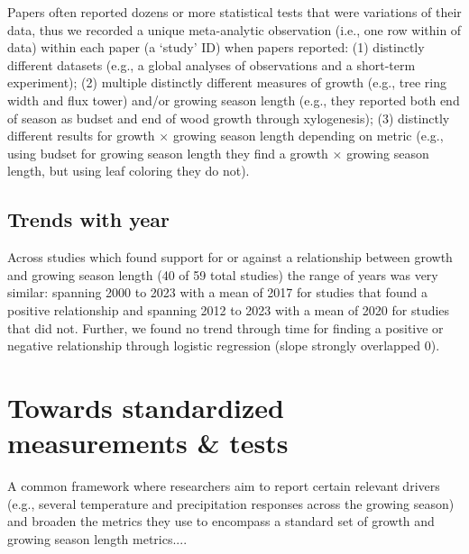 \documentclass[11pt]{article}
\begin{document}
Papers often reported dozens or more statistical tests that were variations of their data, thus we recorded a unique meta-analytic observation (i.e., one row within of data) within each paper (a `study' ID) when papers reported: (1) distinctly different datasets (e.g., a global analyses of observations and a short-term experiment); (2) multiple distinctly different measures of growth (e.g., tree ring width and flux tower) and/or growing season length (e.g., they reported both end of season as budset and end of wood growth through xylogenesis); (3) distinctly different results for growth $\times$  growing season length depending on metric (e.g., using budset for growing season length they find a growth $\times$ growing season length, but using leaf coloring they do not). 

\subsection*{Trends with year}
Across studies which found support for or against a relationship between growth and growing season length (40 of 59 total studies) the range of years was very similar: spanning 2000 to 2023 with a mean of 2017 for studies that found a positive relationship and spanning 2012 to 2023 with a mean of 2020 for studies that did not. Further, we found no trend through time for finding a positive or negative relationship through logistic regression (slope strongly overlapped 0). 


\section*{Towards standardized measurements \& tests}

 A common framework where researchers aim to report certain relevant drivers (e.g., several temperature and precipitation responses across the growing season) and broaden the metrics they use to encompass a standard set of growth and growing season length metrics....
\end{document}
